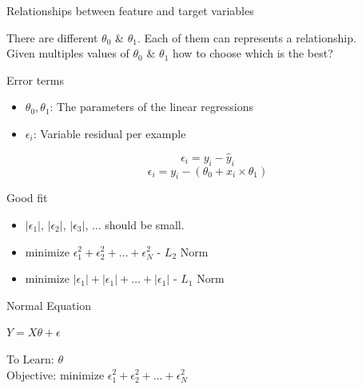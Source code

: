 \documentclass{beamer}
\begin{document}
\begin{frame}{Relationships between feature and target variables}
    
    There are different $\theta_{0}$ $\&$ $\theta_{1}$. Each of them can represents a relationship.\\
    \vspace{0.5em}
    Given multiples values of $\theta_{0}$ $\&$ $\theta_{1}$ how to choose which is the  best?
    
\end{frame}
\begin{frame}{Error terms}
\begin{itemize}
    \item $\theta_{0}, \theta_{1}$: The parameters of the linear regressions
    \item $\epsilon_{i}$: Variable residual per example 
\end{itemize}


\begin{equation*}
    \epsilon_{i} = y_{i} - \hat{y}_{i}
\end{equation*}
\begin{equation*}
    \epsilon_{i} = y_{i} - (\theta_{0} + x_{i}\times\theta_{1})
\end{equation*}
\end{frame}



\begin{frame}{Good fit}

\begin{itemize}
    \item<+-> $|\epsilon_{1}|$, $|\epsilon_{2}|$, $|\epsilon_{3}|$, ... should be small.
    \item<+-> 
${\text{minimize }} \epsilon_{1}^2 + \epsilon_{2}^2 + \dots + \epsilon_{N}^2$ - $L_{2}$ Norm
    \item<+-> 
${\text{minimize }} |\epsilon_{1}| + |\epsilon_{1}| + \dots + |\epsilon_{1}|$ - $L_{1}$ Norm
\end{itemize}
\end{frame}



\begin{frame}{Normal Equation}
    
    
    \begin{tcolorbox}
       $ Y = X\theta + \epsilon$
    \end{tcolorbox}
    
    To Learn: $\theta$ \\
    Objective: ${\text{minimize }} \epsilon_{1}^2 + \epsilon_{2}^2 + \dots + \epsilon_{N}^2$  
\end{frame}
\end{document}
